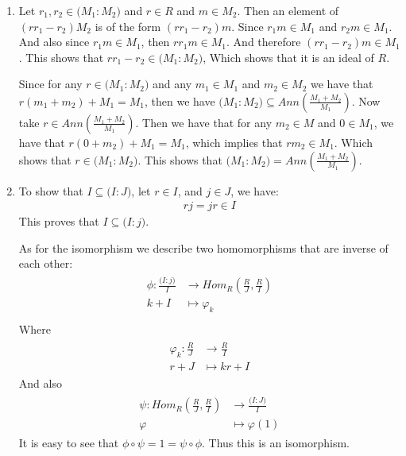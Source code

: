 \begin{enumerate}[label=\ilabel]
    \item 
        Let $r_1, r_2 \in \Big(M_1 : M_2\Big)$ and $r \in R$ and $m \in M_2$. Then an element of $(rr_1 - r_2) M_2$ is of the form $(rr_1 - r_2)m$. Since $r_1m \in M_1$ and $r_2m \in M_1$. And also since $r_1m \in M_1$, then $rr_1m \in M_1$. And therefore $(rr_1 - r_2) m \in M_1$. This shows that $rr_1 - r_2 \in \Big(M_1: M_2\Big)$, Which shows that it is an ideal of $R$.

        Since for any $r \in \Big(M_1: M_2\Big)$ and any $m_1 \in M_1$ and $m_2 \in M_2$ we have that $r(m_1 + m_2) + M_1 = M_1$, then we have $\Big(M_1: M_2\Big) \subseteq Ann(\frac{M_1 + M_2}{M_1})$. Now take $r \in Ann(\frac{M_1 + M_2}{M_1})$. Then we have that for any $m_2 \in M$ and $0 \in M_1$, we have that $r(0 + m_2) + M_1 = M_1$, which implies that $rm_2 \in M_1$. Which shows that $r \in \Big(M_1: M_2\Big)$. This shows that $\Big(M_1: M_2\Big) = Ann(\frac{M_1 + M_2}{M_1})$.

    \item   
        To show that $I \subseteq \Big(I : J\Big)$, let $r \in I$, and $j \in J$, we have:
        \begin{gather*}
            r j  = jr \in I
        \end{gather*}
        This proves that $I \subseteq \Big(I: j\Big)$.

        As for the isomorphism we describe two homomorphisms that are inverse of each other:
        \begin{gather*}
            \begin{split}
                \phi: \frac{\Big(I: j\Big)}{I} & \to Hom_R(\frac{R}{J}, \frac{R}{I})  \\
                k + I &\mapsto \varphi_k
            \end{split} \\
        \end{gather*}
        Where
        \begin{gather*}
            \begin{split}
                \varphi_k: \frac{R}{J} & \to \frac{R}{I} \\
                r + J &\mapsto kr + I
            \end{split}
        \end{gather*}
        And also
        \begin{gather*}
            \begin{split}
                \psi: Hom_R(\frac{R}{J}, \frac{R}{I}) & \to \frac{\Big(I: J\Big)}{I} \\ 
                \varphi & \mapsto \varphi(1)
            \end{split}
        \end{gather*}
        It is easy to see that $\phi \circ \psi = 1 = \psi \circ \phi$. Thus this is an isomorphism.
\end{enumerate}